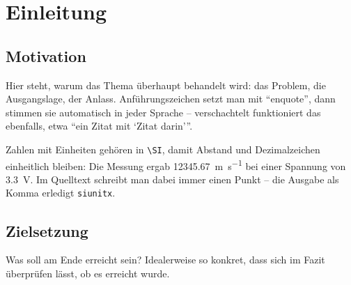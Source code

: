 %
%


\chapter{Einleitung}
\label{ch:einleitung}


\section{Motivation}
\label{sec:motivation}

Hier steht, warum das Thema überhaupt behandelt wird: das Problem, die
Ausgangslage, der Anlass. Anführungszeichen setzt man mit \enquote{enquote},
dann stimmen sie automatisch in jeder Sprache -- verschachtelt funktioniert
das ebenfalls, etwa \enquote{ein Zitat mit \enquote{Zitat darin}}.

Zahlen mit Einheiten gehören in \verb|\SI|, damit Abstand und Dezimalzeichen
einheitlich bleiben: Die Messung ergab \SI{12345.67}{\metre\per\second} bei
einer Spannung von \SI{3.3}{\volt}. Im Quelltext schreibt man dabei immer
einen Punkt -- die Ausgabe als Komma erledigt \texttt{siunitx}.

\lipsum[1] %


\section{Zielsetzung}
\label{sec:zielsetzung}

Was soll am Ende erreicht sein? Idealerweise so konkret, dass sich im Fazit
überprüfen lässt, ob es erreicht wurde.

